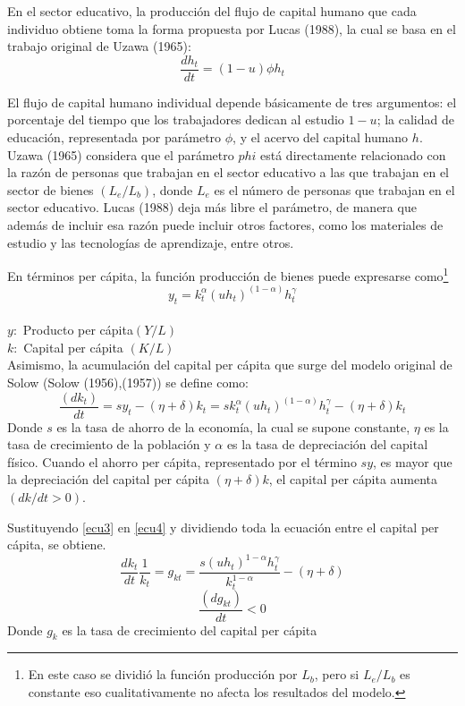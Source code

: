 \documentclass[12pt,notitlepage]{report}
\begin{document}
	En el sector educativo, la producción del flujo de capital humano que cada individuo obtiene toma la forma propuesta por Lucas (1988), la cual se basa en el trabajo original de Uzawa (1965): 
	\begin{equation}\label{ecu2}
		\frac{dh_t}{dt}=(1-u)\phi h_t   
	\end{equation}
	
	El flujo de capital humano individual depende básicamente de tres argumentos: el porcentaje del tiempo que los trabajadores dedican al estudio $1-u$; la calidad de educación, representada por parámetro $\phi$, y el acervo del capital humano $h$. Uzawa (1965) considera que el parámetro $phi$ está directamente relacionado con la razón de personas que trabajan en el sector educativo a las que trabajan en el sector de bienes $(L_e/L_b)$, donde $L_e$ es el número de personas que trabajan en el sector educativo. Lucas (1988) deja más libre el parámetro, de manera que además de incluir esa razón puede incluir otros factores, como los materiales de estudio y las tecnologías de aprendizaje, entre otros.
	
	\addtocounter{footnote}{10}
	
	En términos per cápita, la función producción de bienes puede expresarse como\footnote{En este caso se dividió la función producción por $L_b$, pero si $L_e/L_b$ es constante eso cualitativamente no afecta los resultados del modelo.}
	\begin{equation}\label{ecu3}
		y_t=k_t^\alpha(uh_t)^{(1-\alpha)}h_t^\gamma
	\end{equation}\\
	$y:$ Producto per cápita$(Y/L)$\\
	$k:$ Capital per cápita $(K/L)$\\
	Asimismo, la acumulación del capital per cápita que surge del modelo original de Solow (Solow (1956),(1957)) se define como:
	\begin{equation}\label{ecu4}
		\frac{(dk_t)}{dt}=sy_t-(\eta + \delta)k_t=sk_t^\alpha (uh_t)^{(1-\alpha)}h_t^\gamma - (\eta+\delta)k_t
	\end{equation}
	Donde $s$ es la tasa de ahorro de la economía, la cual se supone constante, $\eta$ es la tasa de crecimiento de la población y $\alpha$ es la tasa de depreciación del capital físico. Cuando el ahorro per cápita, representado por el término $sy$, es mayor que la depreciación del capital per cápita $(\eta +\delta )k$, el capital per cápita aumenta $(dk/dt>0)$.
	
	Sustituyendo \ref{ecu3} en \ref{ecu4} y dividiendo toda la ecuación entre el capital per cápita, se obtiene.
	\begin{equation}\label{ecu5}
		\frac{dk_t}{dt}\frac{1}{k_t}=g_{kt}=\frac{s(uh_t)^{1-\alpha}h_t^\gamma}{k_t^{1-\alpha}}-(\eta + \delta)
	\end{equation}
	\begin{equation*}
		\frac{(dg_{kt})}{dt}<0
	\end{equation*}
	Donde $g_{k}$ es la tasa de crecimiento del capital per cápita
	
\end{document}

